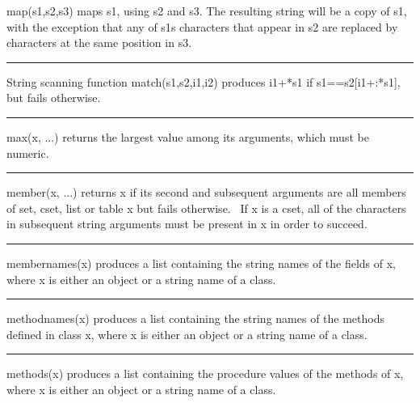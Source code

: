 \noindent
{}\textsf{map(s1,s2,s3)} maps \textsf{s1}, using
\textsf{s2} and \textsf{s3}. The resulting string will be a copy of
\textsf{s1}, with the exception that any of
\textsf{s1}{\textquotesingle}s characters that appear in \textsf{s2}
are replaced by characters at the same position in \textsf{s3}.

\bigskip\hrule\vspace{0.1cm}

\noindent
{}String scanning function \textsf{match(s1,s2,i1,i2)}
produces \textsf{i1+*s1} if \textsf{s1==s2[i1+:*s1]}, but fails
otherwise.

\bigskip\hrule\vspace{0.1cm}

\noindent
{}\textsf{max(x, ...)} returns the largest value among its
arguments, which must be numeric.

\bigskip\hrule\vspace{0.1cm}

\noindent
{}\textsf{member(x, ...)} returns \textsf{x} if its second
and subsequent arguments are all members of set, cset, list or table
\textsf{x} but fails otherwise. \ If \textsf{x} is a cset, all of the
characters in subsequent string arguments must be present in \textsf{x}
in order to succeed.

\bigskip\hrule\vspace{0.1cm}

\noindent
\textsf{membernames(x)} produces a list containing the string names of
the fields of x, where x is either an object or a string name of a
class.

\bigskip\hrule\vspace{0.1cm}

\noindent
\textsf{methodnames(x)} produces a list containing the string names of
the methods defined in class \textsf{x}, where \textsf{x} is either an
object or a string name of a class.

\bigskip\hrule\vspace{0.1cm}

\noindent
\textsf{methods(x)} produces a list containing the procedure values of
the methods of x, where x is either an object or a string name of a
class.

